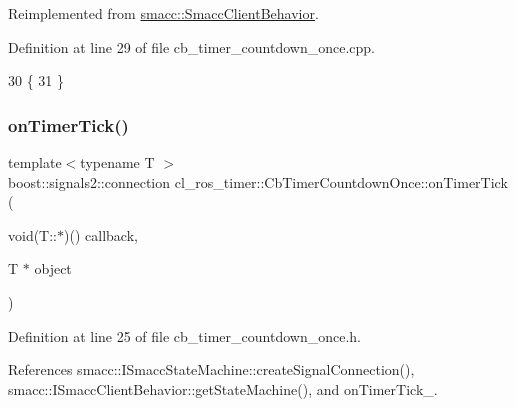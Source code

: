 Reimplemented from \hyperlink{classsmacc_1_1SmaccClientBehavior_a7e4fb6ce81ff96dc172425852d69c0c5}{smacc\+::\+Smacc\+Client\+Behavior}.



Definition at line 29 of file cb\+\_\+timer\+\_\+countdown\+\_\+once.\+cpp.


\begin{DoxyCode}
30 \{
31 \}
\end{DoxyCode}
\mbox{\label{classcl__ros__timer_1_1CbTimerCountdownOnce_a1e20a8c9a9907db8a1d7dacf8c60ad27}} 
\subsubsection{\texorpdfstring{on\+Timer\+Tick()}{onTimerTick()}}
{\footnotesize\ttfamily template$<$typename T $>$ \\
boost\+::signals2\+::connection cl\+\_\+ros\+\_\+timer\+::\+Cb\+Timer\+Countdown\+Once\+::on\+Timer\+Tick (\begin{DoxyParamCaption}\item[{void(T\+::$\ast$)()}]{callback,  }\item[{T $\ast$}]{object }\end{DoxyParamCaption})\hspace{0.3cm}{\ttfamily [inline]}}



Definition at line 25 of file cb\+\_\+timer\+\_\+countdown\+\_\+once.\+h.



References smacc\+::\+I\+Smacc\+State\+Machine\+::create\+Signal\+Connection(), smacc\+::\+I\+Smacc\+Client\+Behavior\+::get\+State\+Machine(), and on\+Timer\+Tick\+\_\+.


